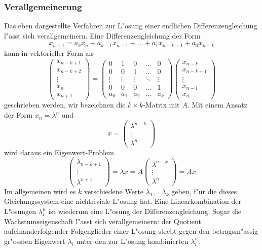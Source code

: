 \subsubsection{Verallgemeinerung}
Das eben dargestellte Verfahren zur L"osung einer endlichen 
Differenzengleichung l"asst sich verallgemeinern.
Eine Differenzengleichung der Form
$$
x_{n+1}=a_kx_n+a_{k-1}x_{n-1}+\dots+a_1x_{n-k+1}+a_0x_{n-k}
$$
kann in vektorieller Form als
$$
\begin{pmatrix}
x_{n-k+1}\\
x_{n-k+2}\\
\vdots\\
x_{n}\\
x_{n+1}
\end{pmatrix}
=
\begin{pmatrix}
0&1&0&\dots&0\\
0&0&1&\dots&0\\
\vdots&\vdots&\vdots&\ddots&\vdots\\
0&0&0&\dots&1\\
a_0&a_1&a_2&\dots&a_k
\end{pmatrix}
\begin{pmatrix}
x_{n-k}\\
x_{n-k+1}\\
\vdots\\
x_{n-1}\\
x_n
\end{pmatrix}
$$
geschrieben werden, wir bezeichnen die $k\times k$-Matrix mit $A$. 
Mit einem Ansatz der Form $x_n=\lambda^n$ und
$$
x=
\begin{pmatrix}
\lambda^{n-k}\\
\vdots\\
\lambda^n
\end{pmatrix}
$$
wird daraus ein
Eigenwert-Problem
$$
\begin{pmatrix}
\lambda_{n-k+1}\\
\vdots\\
\lambda^{n+1}
\end{pmatrix}
=
\lambda x
=A
\begin{pmatrix}
\lambda^{n-k}\\
\vdots\\
\lambda^n
\end{pmatrix}
=Ax
$$
Im allgemeinen wird es $k$ verschiedene Werte $\lambda_1,\dots\lambda_k$ geben,
f"ur die dieses Gleichungssystem eine nichtriviale L"osung hat.
Eine Linearkombination der L"osungen $\lambda_i^n$ ist wiederum eine
L"osung der Differenzengleichung. Sogar die Wachstumseigenschaft l"asst
sich verallgemeinern: der Quotient aufeinanderfolgender Folgenglieder
einer L"osung strebt gegen den betragsm"assig gr"ossten Eigenwert $\lambda_i$
unter den zur L"osung kombinierten $\lambda_i^n$.

